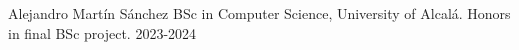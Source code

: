 


\begin{cvhonors}

  \cvhonor
    {Alejandro Martín Sánchez} %
    {BSc in Computer Science, University of Alcalá. Honors in final BSc project.} %
    {} %
    {2023-2024} %

\end{cvhonors}
